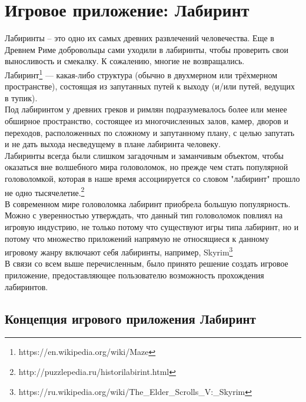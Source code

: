 





\tableofcontents
\newpage



\section{Игровое приложение: Лабиринт}

Лабиринты – это одно их самых древних развлечений человечества. Еще в Древнем Риме добровольцы сами уходили в лабиринты, чтобы проверить свои выносливость и смекалку. К сожалению, многие не возвращались.\\

Лабиринт\footnote{https://en.wikipedia.org/wiki/Maze} — какая-либо структура (обычно в двухмерном или трёхмерном пространстве), состоящая из запутанных путей к выходу (и/или путей, ведущих в тупик).\\

Под лабиринтом у древних греков и римлян подразумевалось более или менее обширное пространство, состоящее из многочисленных залов, камер, дворов и переходов, расположенных по сложному и запутанному плану, с целью запутать и не дать выхода несведущему в плане лабиринта человеку.\\

Лабиринты всегда были слишком загадочным и заманчивым объектом, чтобы оказаться вне волшебного мира головоломок, но прежде чем стать популярной головоломкой, которая в наше время ассоциируется со словом "лабиринт" прошло не одно тысячелетие.\footnote{http://puzzlepedia.ru/historilabirint.html}\\

В современном мире головоломка лабиринт приобрела большую популярность. Можно с уверенностью утверждать, что данный тип головоломок повлиял на игровую индустрию, не только потому что существуют игры типа лабиринт, но и потому что множество приложений напрямую не относящиеся к данному игровому жанру включают себя лабиринты, например, Skyrim\footnote{https://ru.wikipedia.org/wiki/The\_Elder\_Scrolls\_V:\_Skyrim}\\

В связи со всем выше перечисленным, было принято решение создать игровое приложение, предоставляющее пользователю возможность прохождения лабиринтов.

\subsection{Концепция игрового приложения Лабиринт}

